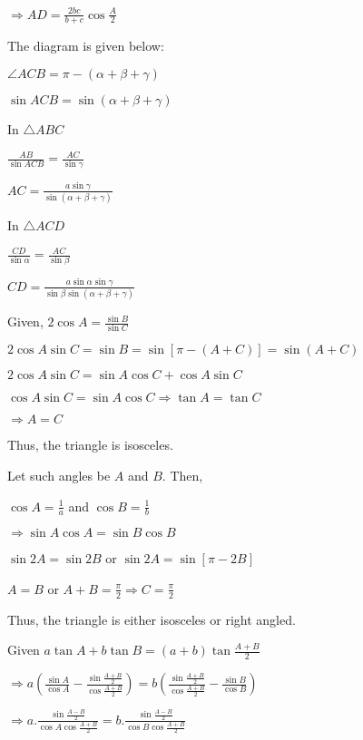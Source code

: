   $\Rightarrow AD = \frac{2bc}{b + c}\cos\frac{A}{2}$

\item The diagram is given below:

  \startplacefigure
    \externalfigure[18_11.pdf]
  \stopplacefigure

  $\angle ACB = \pi - (\alpha + \beta + \gamma)$

  $\sin ACB = \sin(\alpha + \beta + \gamma)$

  In $\triangle ABC$

  $\frac{AB}{\sin ACB} = \frac{AC}{\sin\gamma}$

  $AC = \frac{a\sin\gamma}{\sin(\alpha + \beta + \gamma)}$

  In $\triangle ACD$

  $\frac{CD}{\sin\alpha} = \frac{AC}{\sin\beta}$

  $CD = \frac{a\sin\alpha\sin\gamma}{\sin\beta\sin(\alpha + \beta + \gamma)}$

\item Given, $2\cos A = \frac{\sin B}{\sin C}$

  $2\cos A\sin C = \sin B = \sin[\pi - (A + C)] = \sin(A + C)$

  $2\cos A\sin C = \sin A\cos C + \cos A\sin C$

  $\cos A\sin C = \sin A\cos C\Rightarrow \tan A = \tan C$

  $\Rightarrow A = C$

  Thus, the triangle is isosceles.

\item Let such angles be $A$ and $B.$ Then,

  $\cos A = \frac{1}{a}$ and $\cos B = \frac{1}{b}$

  $\Rightarrow \sin A\cos A = \sin B\cos B$

  $\sin 2A = \sin 2B$ or $\sin 2A = \sin[\pi - 2B]$

  $A = B$ or $A + B = \frac{\pi}{2} \Rightarrow C = \frac{\pi}{2}$

  Thus, the triangle is either isosceles or right angled.

\item Given $a\tan A + b\tan B = (a + b)\tan \frac{A + B}{2}$

  $\Rightarrow a\left(\frac{\sin A}{\cos A} - \frac{\sin \frac{A + B}{2}}{\cos\frac{A + B}{2}}\right) =
  b\left(\frac{\sin\frac{A + B}{2}}{\cos \frac{A + B}{2}} - \frac{\sin B}{\cos B}\right)$

  $\Rightarrow a.\frac{\sin\frac{A - B}{2}}{\cos A\cos \frac{A + B}{2}} = b.\frac{\sin\frac{A - B}{2}}{\cos B\cos\frac{A +
      B}{2}}$

